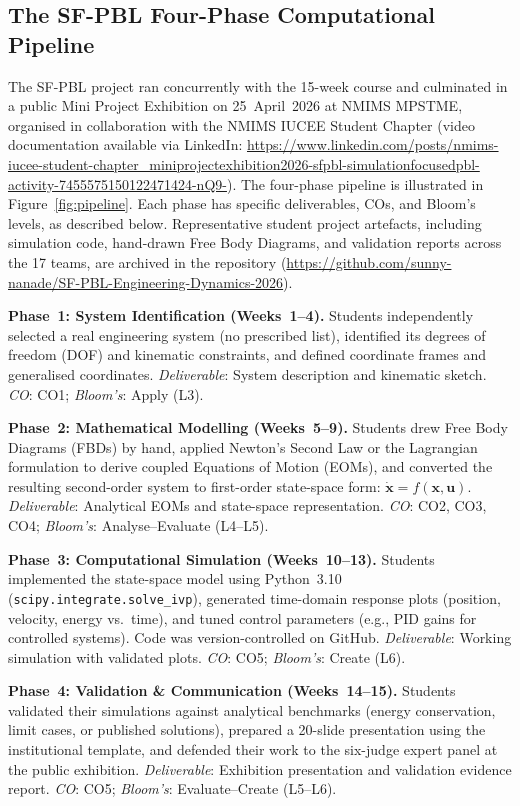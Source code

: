 \documentclass[utf8]{FrontiersinHarvard}
\begin{document}
\subsection{The SF-PBL Four-Phase Computational Pipeline}

The SF-PBL project ran concurrently with the 15-week course and culminated
in a public Mini Project Exhibition on 25~April~2026 at NMIMS MPSTME,
organised in collaboration with the NMIMS IUCEE Student Chapter (video documentation available via LinkedIn: \url{https://www.linkedin.com/posts/nmims-iucee-student-chapter_miniprojectexhibition2026-sfpbl-simulationfocusedpbl-activity-7455575150122471424-nQ9-}). The
four-phase pipeline is illustrated in Figure~\ref{fig:pipeline}. Each
phase has specific deliverables, COs, and Bloom's levels, as described below.
Representative student project artefacts, including simulation code, hand-drawn Free Body Diagrams, and validation reports across the 17 teams, are archived in the repository (\url{https://github.com/sunny-nanade/SF-PBL-Engineering-Dynamics-2026}).

\textbf{Phase~1: System Identification (Weeks~1--4).}
Students independently selected a real engineering system (no prescribed
list), identified its degrees of freedom (DOF) and kinematic constraints,
and defined coordinate frames and generalised coordinates.
\textit{Deliverable}: System description and kinematic sketch.
\textit{CO}: CO1; \textit{Bloom's}: Apply (L3).

\textbf{Phase~2: Mathematical Modelling (Weeks~5--9).}
Students drew Free Body Diagrams (FBDs) by hand, applied Newton's Second
Law or the Lagrangian formulation to derive coupled Equations of Motion
(EOMs), and converted the resulting second-order system to first-order
state-space form: $\dot{\mathbf{x}} = f(\mathbf{x}, \mathbf{u})$.
\textit{Deliverable}: Analytical EOMs and state-space representation.
\textit{CO}: CO2, CO3, CO4; \textit{Bloom's}: Analyse--Evaluate (L4--L5).

\textbf{Phase~3: Computational Simulation (Weeks~10--13).}
Students implemented the state-space model using Python~3.10
(\texttt{scipy.integrate.solve\_ivp}), generated time-domain response
plots (position, velocity, energy vs.~time), and tuned control parameters
(e.g., PID gains for controlled systems). Code was version-controlled on
GitHub. \textit{Deliverable}: Working simulation with validated plots.
\textit{CO}: CO5; \textit{Bloom's}: Create (L6).

\textbf{Phase~4: Validation \& Communication (Weeks~14--15).}
Students validated their simulations against analytical benchmarks (energy
conservation, limit cases, or published solutions), prepared a 20-slide
presentation using the institutional template, and defended their work to
the six-judge expert panel at the public exhibition.
\textit{Deliverable}: Exhibition presentation and validation evidence report.
\textit{CO}: CO5; \textit{Bloom's}: Evaluate--Create (L5--L6).
\end{document}
